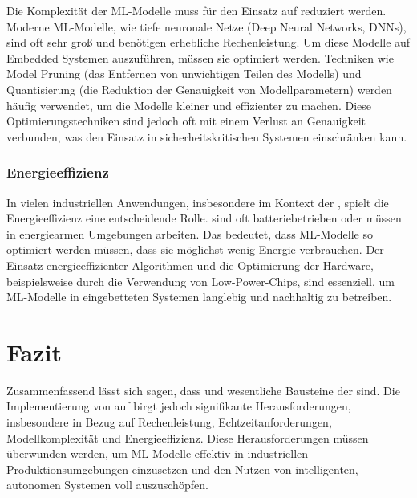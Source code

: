 Die Komplexität der ML-Modelle muss für den Einsatz auf \Emb reduziert werden. Moderne ML-Modelle, wie tiefe neuronale 
Netze (Deep Neural Networks, DNNs), sind oft sehr groß und benötigen erhebliche Rechenleistung. Um diese Modelle auf Embedded 
Systemen auszuführen, müssen sie optimiert werden. Techniken wie Model Pruning (das Entfernen von unwichtigen Teilen des Modells) 
und Quantisierung (die Reduktion der Genauigkeit von Modellparametern) werden häufig verwendet, um die Modelle kleiner und effizienter 
zu machen. Diese Optimierungstechniken sind jedoch oft mit einem Verlust an Genauigkeit verbunden, was den Einsatz in sicherheitskritischen 
Systemen einschränken kann.

\subsubsection{Energieeffizienz}

In vielen industriellen Anwendungen, insbesondere im Kontext der \Iviernull, spielt die Energieeffizienz eine entscheidende Rolle. 
\Emb sind oft batteriebetrieben oder müssen in energiearmen Umgebungen arbeiten. Das bedeutet, dass ML-Modelle so 
optimiert werden müssen, dass sie möglichst wenig Energie verbrauchen. Der Einsatz energieeffizienter Algorithmen und die Optimierung 
der Hardware, beispielsweise durch die Verwendung von Low-Power-Chips, sind essenziell, um ML-Modelle in eingebetteten Systemen 
langlebig und nachhaltig zu betreiben.

\section{Fazit}

Zusammenfassend lässt sich sagen, dass \Emb und \ML wesentliche Bausteine der \Iviernull sind. 
Die Implementierung von \ML auf \Emb birgt jedoch signifikante Herausforderungen, insbesondere in Bezug auf 
Rechenleistung, Echtzeitanforderungen, Modellkomplexität und Energieeffizienz. Diese Herausforderungen müssen überwunden werden, 
um ML-Modelle effektiv in industriellen Produktionsumgebungen einzusetzen und den Nutzen von intelligenten, autonomen Systemen 
voll auszuschöpfen.